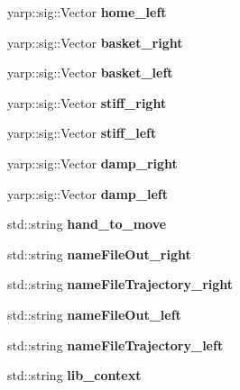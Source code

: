 \begin{DoxyCompactItemize}
\item 
yarp\+::sig\+::\+Vector {\bfseries home\+\_\+left}\label{classGraspingModule_a75a4689473261072a85c67c76ac6567f}

\item 
yarp\+::sig\+::\+Vector {\bfseries basket\+\_\+right}\label{classGraspingModule_a514ee9d4045d3e551a089ffd1f296c49}

\item 
yarp\+::sig\+::\+Vector {\bfseries basket\+\_\+left}\label{classGraspingModule_a4c2cf37b608df9bdce4ff5a2882111ef}

\item 
yarp\+::sig\+::\+Vector {\bfseries stiff\+\_\+right}\label{classGraspingModule_af25aefd74e3a455cd3288896dc7f545e}

\item 
yarp\+::sig\+::\+Vector {\bfseries stiff\+\_\+left}\label{classGraspingModule_a39f2ad508bb3f5baeac30684cd57bf44}

\item 
yarp\+::sig\+::\+Vector {\bfseries damp\+\_\+right}\label{classGraspingModule_af7690eeb0850a02dc05e20e4c4326dd4}

\item 
yarp\+::sig\+::\+Vector {\bfseries damp\+\_\+left}\label{classGraspingModule_ad4dda6219b8a0bf9636c7bf58effc14b}

\item 
std\+::string {\bfseries hand\+\_\+to\+\_\+move}\label{classGraspingModule_af119be2a7acbb0568d1c08f4f6069928}

\item 
std\+::string {\bfseries name\+File\+Out\+\_\+right}\label{classGraspingModule_a627ae74edcebd1e63427d1923bf07004}

\item 
std\+::string {\bfseries name\+File\+Trajectory\+\_\+right}\label{classGraspingModule_a2d67456b32002aeca338be1844e5fe79}

\item 
std\+::string {\bfseries name\+File\+Out\+\_\+left}\label{classGraspingModule_a3d16b71a4e021206b2b60dca65b6bf88}

\item 
std\+::string {\bfseries name\+File\+Trajectory\+\_\+left}\label{classGraspingModule_a1f3841076509b5140edbdb7d01aa3f4b}

\item 
std\+::string {\bfseries lib\+\_\+context}\label{classGraspingModule_a7d96e2271d553a340888ffa1a422d608}


\end{DoxyCompactItemize}
